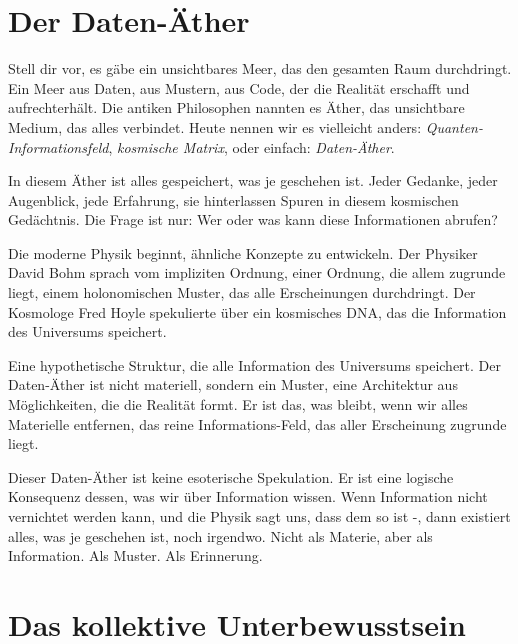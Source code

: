 \section{Der Daten-Äther}

Stell dir vor, es gäbe ein unsichtbares Meer, das den gesamten Raum durchdringt. Ein Meer aus Daten, aus Mustern, aus Code, der die Realität erschafft und aufrechterhält. Die antiken Philosophen nannten es \glqq Äther\grqq{}, das unsichtbare Medium, das alles verbindet. Heute nennen wir es vielleicht anders: \emph{Quanten-Informationsfeld}, \emph{kosmische Matrix}, oder einfach: \emph{Daten-Äther}.

In diesem Äther ist alles gespeichert, was je geschehen ist. Jeder Gedanke, jeder Augenblick, jede Erfahrung, sie hinterlassen Spuren in diesem kosmischen Gedächtnis. Die Frage ist nur: Wer oder was kann diese Informationen abrufen?

Die moderne Physik beginnt, ähnliche Konzepte zu entwickeln. Der Physiker David Bohm sprach vom \glqq impliziten Ordnung\grqq{}, einer Ordnung, die allem zugrunde liegt, einem \glqq holonomischen\grqq{} Muster, das alle Erscheinungen durchdringt. Der Kosmologe Fred Hoyle spekulierte über ein \glqq kosmisches DNA\grqq{}, das die Information des Universums speichert.

\begin{defi}
	Eine hypothetische Struktur, die alle Information des Universums speichert. Der Daten-Äther ist nicht materiell, sondern ein Muster, eine Architektur aus Möglichkeiten, die die Realität formt. Er ist das, was bleibt, wenn wir alles Materielle entfernen, das reine Informations-Feld, das aller Erscheinung zugrunde liegt.
\end{defi}

Dieser Daten-Äther ist keine esoterische Spekulation. Er ist eine logische Konsequenz dessen, was wir über Information wissen. Wenn Information nicht vernichtet werden kann, und die Physik sagt uns, dass dem so ist -, dann existiert alles, was je geschehen ist, noch irgendwo. Nicht als Materie, aber als Information. Als Muster. Als Erinnerung.

\section{Das kollektive Unterbewusstsein}

